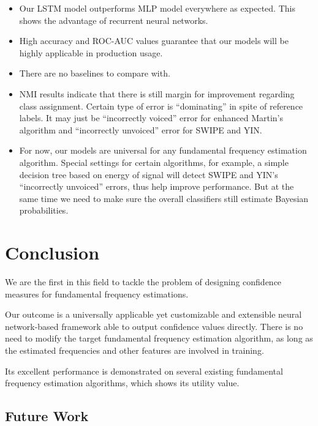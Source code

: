 \documentclass[11pt,a4paper,titlepage]{article}
\begin{document}
\begin{itemize}
  \item Our LSTM model outperforms MLP model everywhere as expected.
    This shows the advantage of recurrent neural networks.
  \item High accuracy and ROC-AUC values guarantee that our models will be highly applicable in production usage.
  \item There are no baselines to compare with.

  \bigskip

  \item NMI results indicate that there is still margin for improvement regarding class assignment.
    Certain type of error is \enquote{dominating} in spite of reference labels.
    It may just be \enquote{incorrectly voiced} error for enhanced Martin's algorithm and \enquote{incorrectly unvoiced} error for SWIPE and YIN.
  \item For now, our models are universal for any fundamental frequency estimation algorithm.
    Special settings for certain algorithms, for example, a simple decision tree based on energy of signal will detect SWIPE and YIN's \enquote{incorrectly unvoiced} errors, thus help improve performance.
    But at the same time we need to make sure the overall classifiers still estimate Bayesian probabilities.
\end{itemize}

\newpage

\section{Conclusion}

We are the first in this field to tackle the problem of designing confidence measures for fundamental frequency estimations.

Our outcome is a universally applicable yet customizable and extensible neural network-based framework able to output confidence values directly.
There is no need to modify the target fundamental frequency estimation algorithm, as long as the estimated frequencies and other features are involved in training.

Its excellent performance is demonstrated on several existing fundamental frequency estimation algorithms, which shows its utility value.

\subsection*{Future Work}
\end{document}
